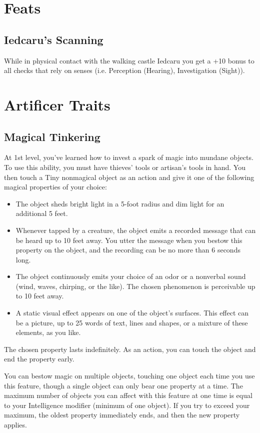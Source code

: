 \documentclass[letterpaper,openany,oneside,twocolumn]{book}
\begin{document}
\section*{Feats}
\subsection*{Iedcaru's Scanning}
While in physical contact with the walking castle Iedcaru you get a +10 bonus to all checks that rely on senses (i.e. Perception (Hearing), Investigation (Sight)).


\section*{Artificer Traits}
\subsection*{Magical Tinkering}
At 1st level, you've learned how to invest a spark of magic into mundane objects. To use this ability, you must have thieves' tools or artisan's tools in hand. You then touch a Tiny nonmagical object as an action and give it one of the following magical properties of your choice:
\begin{itemize}
	\item The object sheds bright light in a 5-foot radius and dim light for an additional 5 feet.
	\item Whenever tapped by a creature, the object emits a recorded message that can be heard up to 10 feet away. You utter the message when you bestow this property on the object, and the recording can be no more than 6 seconds long.
	\item The object continuously emits your choice of an odor or a nonverbal sound (wind, waves, chirping, or the like). The chosen phenomenon is perceivable up to 10 feet away.
	\item A static visual effect appears on one of the object's surfaces. This effect can be a picture, up to 25 words of text, lines and shapes, or a mixture of these elements, as you like.
\end{itemize}
The chosen property lasts indefinitely. As an action, you can touch the object and end the property early.

You can bestow magic on multiple objects, touching one object each time you use this feature, though a single object can only bear one property at a time. The maximum number of objects you can affect with this feature at one time is equal to your Intelligence modifier (minimum of one object). If you try to exceed your maximum, the oldest property immediately ends, and then the new property applies.
\end{document}
